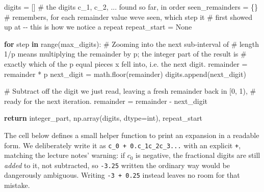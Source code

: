 \documentclass[
  letterpaper,
  DIV=11,
  numbers=noendperiod]{scrreprt}
\newenvironment{Shaded}{\begin{snugshade}}{\end{snugshade}}
\newcommand{\BuiltInTok}[1]{\textcolor[rgb]{0.00,0.23,0.31}{#1}}
\newcommand{\CommentTok}[1]{\textcolor[rgb]{0.37,0.37,0.37}{#1}}
\newcommand{\ControlFlowTok}[1]{\textcolor[rgb]{0.00,0.23,0.31}{\textbf{#1}}}
\newcommand{\KeywordTok}[1]{\textcolor[rgb]{0.00,0.23,0.31}{\textbf{#1}}}
\newcommand{\NormalTok}[1]{\textcolor[rgb]{0.00,0.23,0.31}{#1}}
\newcommand{\OperatorTok}[1]{\textcolor[rgb]{0.37,0.37,0.37}{#1}}
\newcommand{\VariableTok}[1]{\textcolor[rgb]{0.07,0.07,0.07}{#1}}
\theoremstyle{plain}
\theoremstyle{plain}
\theoremstyle{definition}
\theoremstyle{definition}
\theoremstyle{definition}
\theoremstyle{plain}
\theoremstyle{plain}
\theoremstyle{remark}
\begin{document}
\begin{Shaded}
\begin{Highlighting}[]
\NormalTok{    digits }\OperatorTok{=}\NormalTok{ []            }\CommentTok{\# the digits c\_1, c\_2, ... found so far, in order}
\NormalTok{    seen\_remainders }\OperatorTok{=}\NormalTok{ \{\}   }\CommentTok{\# remembers, for each remainder value we\textquotesingle{}ve seen, which step it}
                            \CommentTok{\# first showed up at {-}{-} this is how we notice a repeat}
\NormalTok{    repeat\_start }\OperatorTok{=} \VariableTok{None}

    \ControlFlowTok{for}\NormalTok{ step }\KeywordTok{in} \BuiltInTok{range}\NormalTok{(max\_digits):}
        \CommentTok{\# Zooming into the next sub{-}interval of}
        \CommentTok{\# length 1/p means multiplying the remainder by p; the integer part of the result is}
        \CommentTok{\# exactly which of the p equal pieces x fell into, i.e. the next digit.}
\NormalTok{        remainder }\OperatorTok{=}\NormalTok{ remainder }\OperatorTok{*}\NormalTok{ p}
\NormalTok{        next\_digit }\OperatorTok{=}\NormalTok{ math.floor(remainder)}
\NormalTok{        digits.append(next\_digit)}

        \CommentTok{\# Subtract off the digit we just read, leaving a fresh remainder back in [0, 1),}
        \CommentTok{\# ready for the next iteration.}
\NormalTok{        remainder }\OperatorTok{=}\NormalTok{ remainder }\OperatorTok{{-}}\NormalTok{ next\_digit}

    \ControlFlowTok{return}\NormalTok{ integer\_part, np.array(digits, dtype}\OperatorTok{=}\BuiltInTok{int}\NormalTok{), repeat\_start}
\end{Highlighting}
\end{Shaded}

The cell below defines a small helper function to print an expansion in
a readable form. We deliberately write it as
\texttt{c\_0\ +\ 0.c\_1c\_2c\_3...} with an explicit \texttt{+},
matching the lecture notes' warning: if \(c_0\) is negative, the
fractional digits are still \emph{added} to it, not subtracted, so
\texttt{-3.25} written the ordinary way would be dangerously ambiguous.
Writing \texttt{-3\ +\ 0.25} instead leaves no room for that mistake.
\end{document}
